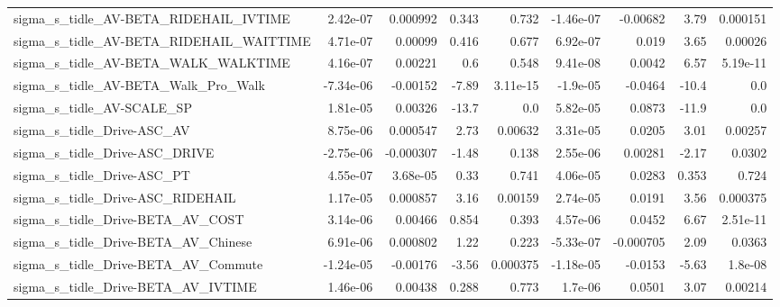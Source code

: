 \begin{tabular}{lrrrrrrrr}
sigma\_s\_tidle\_AV-BETA\_RIDEHAIL\_IVTIME              &    2.42e-07 &     0.000992 &     0.343 &    0.732 &  -1.46e-07 &    -0.00682 &         3.79 &      0.000151 \\
sigma\_s\_tidle\_AV-BETA\_RIDEHAIL\_WAITTIME            &    4.71e-07 &      0.00099 &     0.416 &    0.677 &   6.92e-07 &       0.019 &         3.65 &       0.00026 \\
sigma\_s\_tidle\_AV-BETA\_WALK\_WALKTIME                &    4.16e-07 &      0.00221 &       0.6 &    0.548 &   9.41e-08 &      0.0042 &         6.57 &      5.19e-11 \\
sigma\_s\_tidle\_AV-BETA\_Walk\_Pro\_Walk                &   -7.34e-06 &     -0.00152 &     -7.89 & 3.11e-15 &   -1.9e-05 &     -0.0464 &        -10.4 &           0.0 \\
sigma\_s\_tidle\_AV-SCALE\_SP                          &    1.81e-05 &      0.00326 &     -13.7 &      0.0 &   5.82e-05 &      0.0873 &        -11.9 &           0.0 \\
sigma\_s\_tidle\_Drive-ASC\_AV                         &    8.75e-06 &     0.000547 &      2.73 &  0.00632 &   3.31e-05 &      0.0205 &         3.01 &       0.00257 \\
sigma\_s\_tidle\_Drive-ASC\_DRIVE                      &   -2.75e-06 &    -0.000307 &     -1.48 &    0.138 &   2.55e-06 &     0.00281 &        -2.17 &        0.0302 \\
sigma\_s\_tidle\_Drive-ASC\_PT                         &    4.55e-07 &     3.68e-05 &      0.33 &    0.741 &   4.06e-05 &      0.0283 &        0.353 &         0.724 \\
sigma\_s\_tidle\_Drive-ASC\_RIDEHAIL                   &    1.17e-05 &     0.000857 &      3.16 &  0.00159 &   2.74e-05 &      0.0191 &         3.56 &      0.000375 \\
sigma\_s\_tidle\_Drive-BETA\_AV\_COST                   &    3.14e-06 &      0.00466 &     0.854 &    0.393 &   4.57e-06 &      0.0452 &         6.67 &      2.51e-11 \\
sigma\_s\_tidle\_Drive-BETA\_AV\_Chinese                &    6.91e-06 &     0.000802 &      1.22 &    0.223 &  -5.33e-07 &   -0.000705 &         2.09 &        0.0363 \\
sigma\_s\_tidle\_Drive-BETA\_AV\_Commute                &   -1.24e-05 &     -0.00176 &     -3.56 & 0.000375 &  -1.18e-05 &     -0.0153 &        -5.63 &       1.8e-08 \\
sigma\_s\_tidle\_Drive-BETA\_AV\_IVTIME                 &    1.46e-06 &      0.00438 &     0.288 &    0.773 &    1.7e-06 &      0.0501 &         3.07 &       0.00214 \\

\end{tabular}

